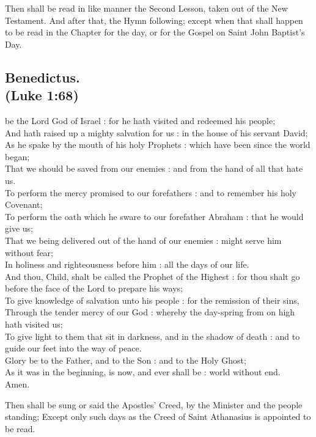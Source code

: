 \begin{rubric}
Then shall be read in like manner the Second Lesson, taken out of the New Testament.
And after that, the Hymn following; except when that shall happen to be read in the Chapter for the day, or for the Gospel on Saint John Baptist's Day.
\end{rubric}

\subsection{Benedictus.\\
(Luke 1:68)}

 be the Lord God of Israel : for he hath visited and redeemed his people;\\
And hath raised up a mighty salvation for us : in the house of his servant David;\\
As he spake by the mouth of his holy Prophets : which have been since the world began;\\
That we should be saved from our enemies : and from the hand of all that hate us.\\
To perform the mercy promised to our forefathers : and to remember his holy Covenant;\\
To perform the oath which he sware to our forefather Abraham : that he would give us;\\
That we being delivered out of the hand of our enemies : might serve him without fear;\\
In holiness and righteousness before him : all the days of our life.\\
And thou, Child, shalt be called the Prophet of the Highest : for thou shalt go before the face of the Lord to prepare his ways;\\
To give knowledge of salvation unto his people : for the remission of their sins,\\
Through the tender mercy of our God : whereby the day-spring from on high hath visited us;\\
To give light to them that sit in darkness, and in the shadow of death : and to guide our feet into the way of peace.\\
Glory be to the Father, and to the Son : and to the Holy Ghost;\\
As it was in the beginning, is now, and ever shall be : world without end.\\
Amen.

\begin{rubric}
Then shall be sung or said the Apostles' Creed, by the Minister and the people standing;
Except only such days as the Creed of Saint Athanasius is appointed to be read.
\end{rubric}

